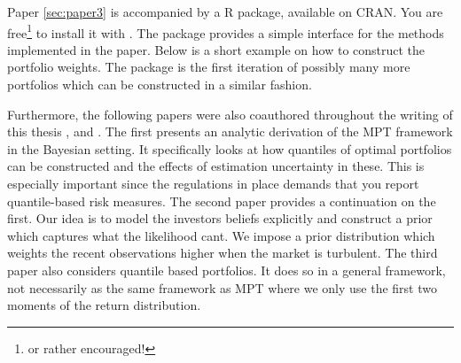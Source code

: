 \documentclass[]{book}\usepackage{knitr}
\begin{document}
Paper \ref{sec:paper3} is accompanied by a R package, available on CRAN. You are free\footnote{or rather encouraged!} to install it with \hlstd{(}\hlstd{)}. The package provides a simple interface for the methods implemented in the paper. Below is a short example on how to construct the portfolio weights. The package is the first iteration of possibly many more portfolios which can be constructed in a similar fashion. 

\begin{knitrout}
\color{fgcolor}
\end{knitrout}



Furthermore, the following papers were also coauthored throughout the writing of this thesis \cite{bodnar2020quantile}, \cite{bodnar2021bayesian}  and \cite{bodnar2021quantile}.
The first presents an analytic derivation of the MPT framework in the Bayesian setting. 
It specifically looks at how quantiles of optimal portfolios can be constructed and the effects of estimation uncertainty in these. 
This is especially important since the regulations in place demands that you report quantile-based risk measures. 
The second paper provides a continuation on the first. 
Our idea is to model the investors beliefs explicitly and construct a prior which captures what the likelihood cant. 
We impose a prior distribution which weights the recent observations higher when the market is turbulent. 
The third paper also considers quantile based portfolios. 
It does so in a general framework, not necessarily as the same framework as MPT where we only use the first two moments of the return distribution.
\end{document}
